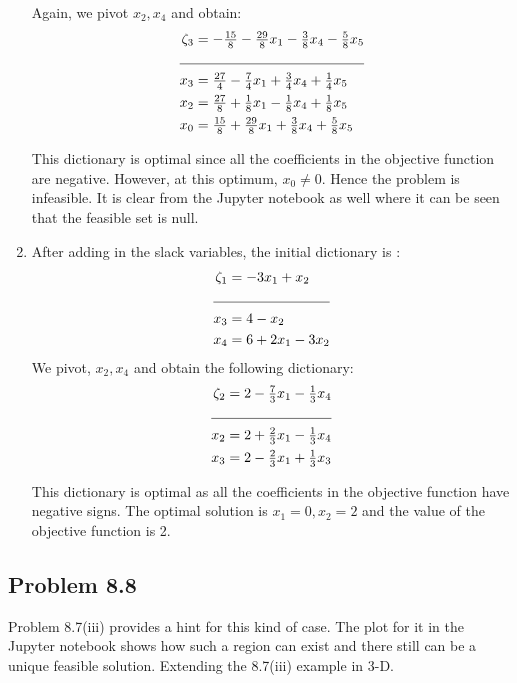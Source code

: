\documentclass[letterpaper,12pt]{article}
\theoremstyle{definition}
\begin{document}
\begin{enumerate}
Again, we pivot $x_2, x_4$ and obtain:
\begin{align*}
  \zeta_3 &= -\tfrac{15}{8} - \tfrac{29}{8}x_1-\tfrac{3}{8}x_4- \tfrac{5}{8}x_5\\
  \cline{1-2}
  x_3 &= \tfrac{27}{4} - \tfrac{7}{4}x_1+\tfrac{3}{4}x_4+\tfrac{1}{4}x_5\\
  x_2 &= \tfrac{27}{8} + \tfrac{1}{8}x_1 -\tfrac{1}{8}x_4+\tfrac{1}{8}x_5\\
  x_0 &= \tfrac{15}{8} + \tfrac{29}{8}x_1 + \tfrac{3}{8}x_4 + \tfrac{5}{8}x_5\\
\end{align*}

This dictionary is optimal since all the coefficients in the objective function are negative. However,
at this optimum, $x_0 \ne 0$. Hence the problem is infeasible. It is clear from the Jupyter notebook as well where it can be seen that the feasible set is null. 

\item After adding in the slack variables, the initial dictionary is :
\begin{align*}
  \zeta_1 &= -3x_1+x_2\\
  \cline{1-2}
  x_3 &= 4-x_2\\
  x_4 &= 6+2x_1-3x_2\\
\end{align*}
We pivot, $x_2, x_4$ and obtain the following dictionary:
\begin{align*}
  \zeta_2 &= 2-\tfrac{7}{3}x_1-\tfrac{1}{3}x_4\\
  \cline{1-2}
  x_2 &= 2+\tfrac{2}{3}x_1 - \tfrac{1}{3}x_4\\
  x_3 &= 2-\tfrac{2}{3}x_1+\tfrac{1}{3}x_3\\
\end{align*}

This dictionary is optimal as all the coefficients in the objective function have negative signs.
The optimal solution is $x_1= 0, x_2 = 2$ and the value of the objective function is 2.
\end{enumerate}

\subsection*{Problem 8.8 }
Problem 8.7(iii) provides a hint for this kind of case. The plot for it in the Jupyter notebook shows how such a region can exist and there still can be a unique feasible solution. Extending the 8.7(iii) example in 3-D.
\end{document}
